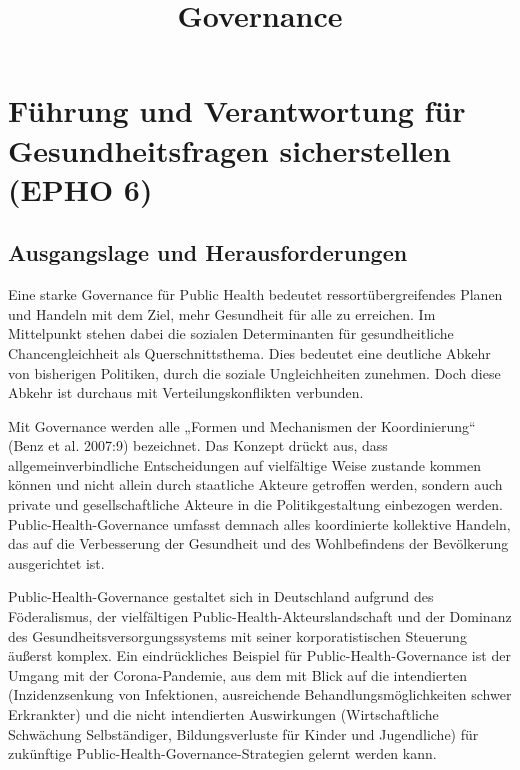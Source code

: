 \documentclass{article}
\begin{document}
\title{Governance}

\maketitle


\section{Führung und Verantwortung für Gesundheitsfragen sicherstellen (EPHO 6)}\label{H5930285}



\subsection{Ausgangslage und Herausforderungen}\label{H7836380}



Eine starke Governance für Public Health bedeutet ressortübergreifendes Planen und Handeln mit dem Ziel, mehr Gesundheit für alle zu erreichen. Im Mittelpunkt stehen dabei die sozialen Determinanten für gesundheitliche Chancengleichheit als Querschnittsthema. Dies bedeutet eine deutliche Abkehr von bisherigen Politiken, durch die soziale Ungleichheiten zunehmen. Doch diese Abkehr ist durchaus mit Verteilungskonflikten verbunden.


Mit Governance werden alle „Formen und Mechanismen der Koordinierung“ (Benz et al. 2007:9) bezeichnet. Das Konzept drückt aus, dass allgemeinverbindliche Entscheidungen auf vielfältige Weise zustande kommen können und nicht allein durch staatliche Akteure getroffen werden, sondern auch private und gesellschaftliche Akteure in die Politikgestaltung einbezogen werden. Public-Health-Governance umfasst demnach alles koordinierte kollektive Handeln, das auf die Verbesserung der Gesundheit und des Wohlbefindens der Bevölkerung ausgerichtet ist. 


Public-Health-Governance gestaltet sich in Deutschland aufgrund des Föderalismus, der vielfältigen Public-Health-Akteurslandschaft und der Dominanz des Gesundheitsversorgungssystems mit seiner korporatistischen Steuerung äußerst komplex. Ein eindrückliches Beispiel für Public-Health-Governance ist der Umgang mit der Corona-Pandemie, aus dem mit Blick auf die intendierten (Inzidenzsenkung von Infektionen, ausreichende Behandlungsmöglichkeiten schwer Erkrankter) und die nicht intendierten Auswirkungen (Wirtschaftliche Schwächung Selbständiger, Bildungsverluste für Kinder und Jugendliche) für zukünftige Public-Health-Governance-Strategien gelernt werden kann.
\end{document}

